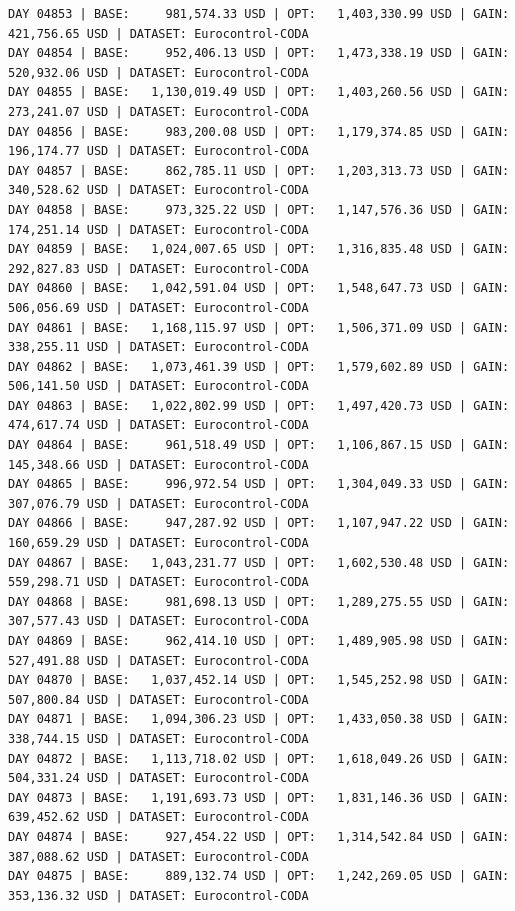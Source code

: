 \documentclass[11pt,a4paper]{article}
\begin{document}
\begin{verbatim}
DAY 04853 | BASE:     981,574.33 USD | OPT:   1,403,330.99 USD | GAIN: 421,756.65 USD | DATASET: Eurocontrol-CODA
DAY 04854 | BASE:     952,406.13 USD | OPT:   1,473,338.19 USD | GAIN: 520,932.06 USD | DATASET: Eurocontrol-CODA
DAY 04855 | BASE:   1,130,019.49 USD | OPT:   1,403,260.56 USD | GAIN: 273,241.07 USD | DATASET: Eurocontrol-CODA
DAY 04856 | BASE:     983,200.08 USD | OPT:   1,179,374.85 USD | GAIN: 196,174.77 USD | DATASET: Eurocontrol-CODA
DAY 04857 | BASE:     862,785.11 USD | OPT:   1,203,313.73 USD | GAIN: 340,528.62 USD | DATASET: Eurocontrol-CODA
DAY 04858 | BASE:     973,325.22 USD | OPT:   1,147,576.36 USD | GAIN: 174,251.14 USD | DATASET: Eurocontrol-CODA
DAY 04859 | BASE:   1,024,007.65 USD | OPT:   1,316,835.48 USD | GAIN: 292,827.83 USD | DATASET: Eurocontrol-CODA
DAY 04860 | BASE:   1,042,591.04 USD | OPT:   1,548,647.73 USD | GAIN: 506,056.69 USD | DATASET: Eurocontrol-CODA
DAY 04861 | BASE:   1,168,115.97 USD | OPT:   1,506,371.09 USD | GAIN: 338,255.11 USD | DATASET: Eurocontrol-CODA
DAY 04862 | BASE:   1,073,461.39 USD | OPT:   1,579,602.89 USD | GAIN: 506,141.50 USD | DATASET: Eurocontrol-CODA
DAY 04863 | BASE:   1,022,802.99 USD | OPT:   1,497,420.73 USD | GAIN: 474,617.74 USD | DATASET: Eurocontrol-CODA
DAY 04864 | BASE:     961,518.49 USD | OPT:   1,106,867.15 USD | GAIN: 145,348.66 USD | DATASET: Eurocontrol-CODA
DAY 04865 | BASE:     996,972.54 USD | OPT:   1,304,049.33 USD | GAIN: 307,076.79 USD | DATASET: Eurocontrol-CODA
DAY 04866 | BASE:     947,287.92 USD | OPT:   1,107,947.22 USD | GAIN: 160,659.29 USD | DATASET: Eurocontrol-CODA
DAY 04867 | BASE:   1,043,231.77 USD | OPT:   1,602,530.48 USD | GAIN: 559,298.71 USD | DATASET: Eurocontrol-CODA
DAY 04868 | BASE:     981,698.13 USD | OPT:   1,289,275.55 USD | GAIN: 307,577.43 USD | DATASET: Eurocontrol-CODA
DAY 04869 | BASE:     962,414.10 USD | OPT:   1,489,905.98 USD | GAIN: 527,491.88 USD | DATASET: Eurocontrol-CODA
DAY 04870 | BASE:   1,037,452.14 USD | OPT:   1,545,252.98 USD | GAIN: 507,800.84 USD | DATASET: Eurocontrol-CODA
DAY 04871 | BASE:   1,094,306.23 USD | OPT:   1,433,050.38 USD | GAIN: 338,744.15 USD | DATASET: Eurocontrol-CODA
DAY 04872 | BASE:   1,113,718.02 USD | OPT:   1,618,049.26 USD | GAIN: 504,331.24 USD | DATASET: Eurocontrol-CODA
DAY 04873 | BASE:   1,191,693.73 USD | OPT:   1,831,146.36 USD | GAIN: 639,452.62 USD | DATASET: Eurocontrol-CODA
DAY 04874 | BASE:     927,454.22 USD | OPT:   1,314,542.84 USD | GAIN: 387,088.62 USD | DATASET: Eurocontrol-CODA
DAY 04875 | BASE:     889,132.74 USD | OPT:   1,242,269.05 USD | GAIN: 353,136.32 USD | DATASET: Eurocontrol-CODA

\end{verbatim}
\end{document}
